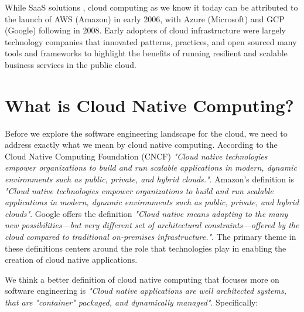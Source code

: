 \documentclass[conference]{IEEEconf}
\begin{document}
While SaaS solutions , cloud computing as we know it today can be attributed to the launch of AWS (Amazon) \cite{AWSLaunch} in early 2006, with Azure (Microsoft)\cite{AzureLaunch} and GCP (Google)\cite{GCPLaunch} following in 2008. Early adopters of cloud infrastructure were largely technology companies that innovated patterns, practices, and open sourced many tools and frameworks to highlight the benefits of running resilient and scalable business services in the public cloud.  


\section{What is Cloud Native Computing?}
\label{sec:WhatIsCNF}
Before we explore the software engineering landscape for the cloud, we need to address exactly what we mean by cloud native computing.  According to the Cloud Native Computing Foundation (CNCF)\cite{CNCFHome}  \textit{"Cloud native technologies empower organizations to build and run scalable applications in modern, dynamic environments such as public, private, and hybrid clouds."}.  Amazon's definition is \textit{"Cloud native technologies empower organizations to build and run scalable applications in modern, dynamic environments such as public, private, and hybrid clouds"}. Google offers the definition \textit{"Cloud native means adapting to the many new possibilities—but very different set of architectural constraints—offered by the cloud compared to traditional on-premises infrastructure."}.  The primary theme in these definitions centers around the role that technologies play in enabling the creation of cloud native applications.

We think a better definition of cloud native computing that focuses more on  software engineering is \textit{"Cloud native applications are well architected systems, that are "container" packaged, and dynamically managed"}. Specifically:
\end{document}

